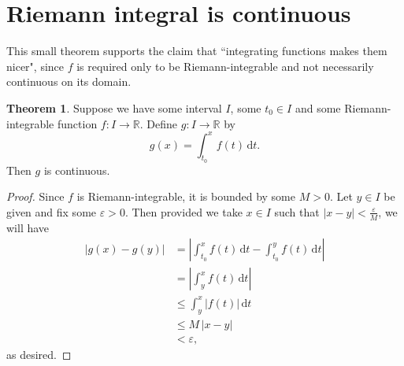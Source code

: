 \documentclass[12pt]{article}
\theoremstyle{definition}
\newtheorem{theorem}{Theorem}
\begin{document}
\section{Riemann integral is continuous}

This small theorem supports the claim that ``integrating functions makes them nicer", since \( f \) is required only to be Riemann-integrable and not necessarily continuous on its domain.

\begin{theorem}

Suppose we have some interval \( I \), some \( t_0 \in I \) and some Riemann-integrable function \( f : I \to \mathbb{R} \). Define \( g : I \to \mathbb{R} \) by
\[
g(x) = \int_{t_0}^x{ f(t) \, \text{d}t }.
\]
Then \( g \) is continuous.

\end{theorem}

\begin{proof}

Since \( f \) is Riemann-integrable, it is bounded by some \( M > 0 \). Let \( y \in I \) be given and fix some \( \varepsilon > 0 \). Then provided we take \( x \in I \) such that \( |x - y| < \frac{\varepsilon}{M} \), we will have
\begin{align*}
|g(x) - g(y)| &= \left| \int_{t_0}^x f(t) \, \text{d}t - \int_{t_0}^y f(t) \, \text{d}t \right| \\
&= \left| \int_y^x f(t) \, \text{d}t \right| \\
&\leq \int_y^x |f(t)| \, \text{d}t \\
&\leq M \, |x - y| \\
&< \varepsilon,
\end{align*}
as desired.
\end{proof}
\end{document}
